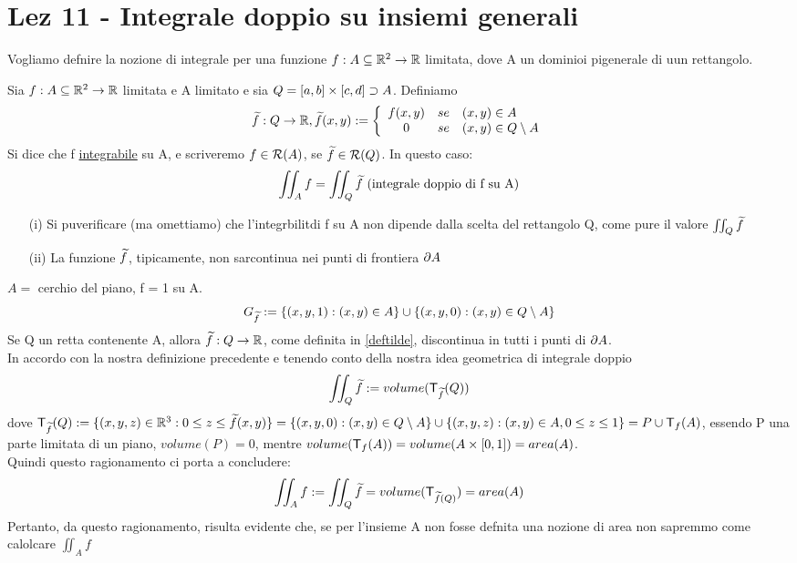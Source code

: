 \section{Lez 11 - Integrale doppio su insiemi generali}
Vogliamo defnire la nozione di integrale per una funzione $f: A \subseteq \mathbb{R}^2 \to \mathbb{R}$ limitata, dove 
A \ace un dominioi pi\acu generale di uun rettangolo.
\begin{definition}
  Sia $f: A \subseteq \mathbb{R}^2 \to \mathbb{R}$ limitata e A limitato e sia $Q = [a,b]\times[c,d] \supset A$. Definiamo
  $$\widetilde{f} : Q \to \mathbb{R}, \widetilde{f}(x,y) := \left\{\begin{array}{ccl}
    f(x,y) & se & (x,y)\in A \\
    0 & se & (x,y)\in Q\setminus A \\
  \end{array}\right.$$ 
  Si dice che f \ace \underline{integrabile} su A, e scriveremo $f \in \mathcal{R}(A)$, se 
  $\widetilde{f} \in \mathcal{R}(Q)$. In questo caso:
  $$\iint_{A} f = \iint_{Q} \widetilde{f} \text{ (integrale doppio di f su A)}$$
  \label{deftilde}
\end{definition}
\begin{osservazione}
  \begin{itemize}
    \item[(i)] Si pu\aco verificare (ma omettiamo) che l'integrbilit\aca di f su A non dipende dalla
                scelta del rettangolo Q, come pure il valore $\iint_{Q} \widetilde{f}$
    \item[(ii)] La funzione $\widetilde{f}$, tipicamente, non sar\aca continua nei punti di frontiera $\partial A$
  \end{itemize}
\end{osservazione}
\begin{example}
  $A = $ cerchio del piano, f = 1 su A.
  $$G_{\widetilde{f}} := \{(x,y,1) : (x,y) \in A\} \cup \{(x,y,0):(x,y)\in Q \setminus A\}$$
  Se Q \ace un retta contenente A, allora $\widetilde{f}:Q\to\mathbb{R}$, come definita in \ref{deftilde}, \ace discontinua in 
  tutti i punti di $\partial A$. \\
  In accordo con la nostra definizione precedente e tenendo conto della nostra idea geometrica di integrale doppio
  $$\iint_{Q}\widetilde{f} := volume(\mathsf{T}_{\widetilde{f}}(Q))$$
  dove $\mathsf{T}_{\widetilde{f}}(Q):=\{(x,y,z)\in\mathbb{R}^3: 0 \leq z \leq \widetilde{f}(x,y)\} = 
  \{(x,y,0):(x,y)\in Q \setminus A\}\cup\{(x,y,z):(x,y)\in A, 0 \leq z \leq 1\} = P \cup \mathsf{T}_{f}(A)$, 
  essendo P una parte limitata di un piano, $volume(P) = 0$, mentre 
  $volume(\mathsf{T}_{f}(A)) = volume(A \times [0,1]) = area(A)$. \\
  Quindi questo ragionamento ci porta a concludere:
  $$\iint_{A} f := \iint_{Q} \widetilde{f} = volume(\mathsf{T}_{\widetilde{f}(Q)}) = area(A)$$
  Pertanto, da questo ragionamento, risulta evidente che, se per l'insieme A non fosse defnita una nozione di area 
  non sapremmo come calolcare $\iint_{A} f$
\end{example}
